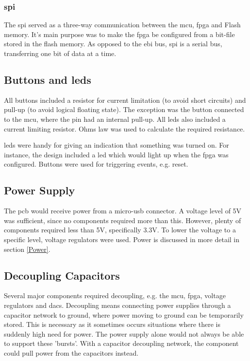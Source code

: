 \subsubsection{\gls{spi}}
The \gls{spi} served as a three-way communication between the \gls{mcu}, \gls{fpga} and Flash memory.
It's main purpose was to make the \gls{fpga} be configured from a bit-file stored in the flash memory.
As opposed to the \gls{ebi} bus, \gls{spi} is a serial bus, transferring one bit of data at a time.

\subsection{Buttons and \gls{led}s}
All buttons included a resistor for current limitation (to avoid short circuits) and pull-up (to avoid logical floating state).
The exception was the button connected to the \gls{mcu}, where the pin had an internal pull-up.
All \gls{led}s also included a current limiting resistor. 
Ohms law was used to calculate the required resistance\cite{ohm}.

\gls{led}s were handy for giving an indication that something was turned on. 
For instance, the design included a \gls{led} which would light up when the \gls{fpga} was configured.
Buttons were used for triggering events, e.g. reset.

\subsection{Power Supply}
The \gls{pcb} would receive power from a micro-\gls{usb} connector. 
A voltage level of 5V was sufficient, since no components required more than this. 
However, plenty of components required less than 5V, specifically 3.3V. 
To lower the voltage to a specific level, voltage regulators were used. 
Power is discussed in more detail in section \ref{Power}.

\subsection{Decoupling Capacitors}
Several major components required decoupling, e.g. the \gls{mcu}, \gls{fpga}, voltage regulators and \gls{dac}s.
Decoupling means connecting power supplies through a capacitor network to ground, where power moving to ground can be temporarily stored.
This is necessary as it sometimes occurs situations where there is suddenly high need for power.
The power supply alone would not always be able to support these 'bursts'.
With a capacitor decoupling network, the component could pull power from the capacitors instead.

